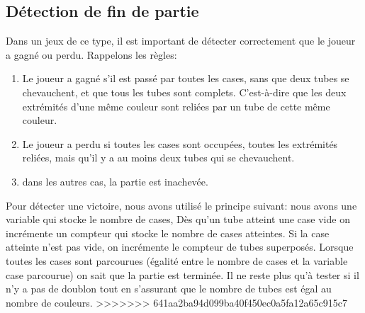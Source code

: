 \documentclass[12pt, a4paper]{article}%
\begin{document}
    \subsection{Détection de fin de partie}
    Dans un jeux de ce type, il est important de détecter correctement que le joueur a gagné ou perdu. Rappelons les règles:
    \begin{enumerate}
        \item Le joueur a gagné s'il est passé par toutes les cases, sans que deux tubes se chevauchent, et que tous les tubes
            sont complets. C'est-à-dire que les deux extrémités d'une même couleur sont reliées par un tube de cette même couleur.
        \item Le joueur a perdu si toutes les cases sont occupées, toutes les extrémités reliées, mais qu'il y a au moins deux
            tubes qui se chevauchent.
        \item dans les autres cas, la partie est inachevée.
    \end{enumerate}
   Pour détecter une victoire, nous avons utilisé le principe suivant: nous avons une variable qui stocke le nombre de cases, Dès
   qu'un tube atteint une case vide on incrémente un compteur qui stocke le nombre de cases atteintes. Si la case atteinte n'est
   pas vide, on incrémente le compteur de tubes superposés. Lorsque toutes les cases sont parcourues (égalité entre le nombre de
   cases et la variable case parcourue) on sait que la partie est terminée. Il ne reste plus qu'à tester si il n'y a pas de
   doublon tout en s'assurant que le nombre de tubes est égal au nombre de couleurs.
>>>>>>> 641aa2ba94d099ba40f450ec0a5fa12a65c915c7
\end{document}
